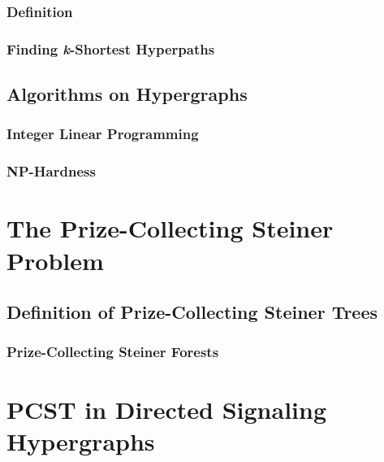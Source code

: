 \documentclass[12pt,twoside]{reedthesis}
\begin{document}
\subsection{Definition}

\subsection{Finding \textit{k}-Shortest Hyperpaths}

\section{Algorithms on Hypergraphs}

\subsection{Integer Linear Programming}

\subsection{NP-Hardness}

	\chapter{The Prize-Collecting Steiner Problem}
	
\section{Definition of Prize-Collecting Steiner Trees}

\subsection{Prize-Collecting Steiner Forests}

	\chapter{PCST in Directed Signaling Hypergraphs}
\end{document}
